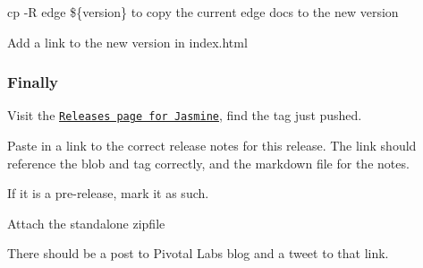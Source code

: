 \begin{DoxyEnumerate}
\item {\ttfamily cp -\/\+R edge \$\{version\}} to copy the current edge docs to the new version
\end{DoxyEnumerate}
\begin{DoxyEnumerate}
\item Add a link to the new version in {\ttfamily index.\+html}
\end{DoxyEnumerate}

\subsubsection*{Finally}


\begin{DoxyEnumerate}
\item Visit the \href{https://github.com/jasmine/jasmine/releases}{\tt Releases page for Jasmine}, find the tag just pushed.
\begin{DoxyEnumerate}
\item Paste in a link to the correct release notes for this release. The link should reference the blob and tag correctly, and the markdown file for the notes.
\end{DoxyEnumerate}
\begin{DoxyEnumerate}
\item If it is a pre-\/release, mark it as such.
\end{DoxyEnumerate}
\begin{DoxyEnumerate}
\item Attach the standalone zipfile
\end{DoxyEnumerate}
\end{DoxyEnumerate}

There should be a post to Pivotal Labs blog and a tweet to that link. 